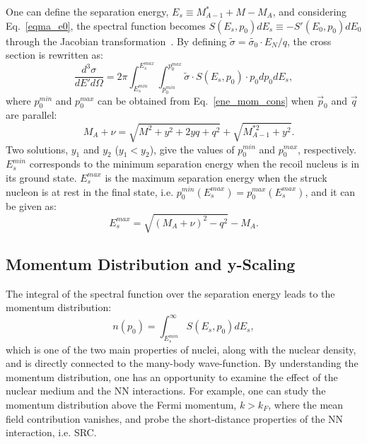 One can define the separation energy, $E_{s}\equiv M_{A-1}^{*}+M-M_{A}$, and considering Eq.~\eqref{eqma_e0}, the spectral function becomes $S(E_{s},p_{0})dE_{s}\equiv - S'(E_{0},p_{0})dE_{0}$ through the Jacobian transformation~\cite{john_thesis}. By defining $\tilde{\sigma}=\tilde{\sigma_{0}}\cdot E_{N}/q$, the cross section is rewritten as:
\begin{equation}
  \frac{d^{3}\sigma}{dE'd\Omega} = 2\pi \int_{E_{s}^{min}}^{E_{s}^{max}} \int_{p_{0}^{min}}^{p_{0}^{max}}\tilde{\sigma}\cdot S(E_{s},p_{0})\cdot p_{0}dp_{0}dE_{s},
  \label{in_qe_xs1}
\end{equation}
where $p_{0}^{min}$ and $p_{0}^{max}$ can be obtained from Eq.~\eqref{ene_mom_cons} when $\vec{p}_{0}$ and $\vec{q}$ are parallel:
\begin{equation}
  \quad  M_{A}+\nu = \sqrt{M^{2}+y^{2}+2yq+q^{2}}+\sqrt{M_{A-1}^{*2}+y^{2}}.
  \label{ene_mom_cons_y}
\end{equation}	
Two solutions, $y_{1}$ and $y_{2}$ ($y_{1}<y_{2}$), give the values of $p_{0}^{min}$ and $p_{0}^{max}$, respectively. $E_{s}^{min}$ corresponds to the minimum separation energy when the recoil nucleus is in its ground state. $E_{s}^{max}$ is the maximum separation energy when the struck nucleon is at rest in the final state, i.e. $p_{0}^{min}(E_{s}^{max}) = p_{0}^{max}(E_{s}^{max})$, and it can be given as:
\begin{equation}
  E_{s}^{max}=\sqrt{(M_{A}+\nu)^{2}-q^{2}}-M_{A}.
\end{equation}
\subsection{Momentum Distribution and y-Scaling}
 The integral of the spectral function over the separation energy leads to the momentum distribution:
\begin{equation}
  n(p_{0}) = \int_{E_{s}^{min}}^{\infty} S(E_{s},p_{0})dE_{s},
  \label{np_mom_eq}
\end{equation}
which is one of the two main properties of nuclei, along with the nuclear density, and is directly connected to the many-body wave-function. By understanding the momentum distribution, one has an opportunity to examine the effect of the nuclear medium and the NN interactions. For example, one can study the momentum distribution above the Fermi momentum, $k>k_{F}$, where the mean field contribution vanishes, and probe the short-distance properties of the NN interaction, i.e. SRC.

